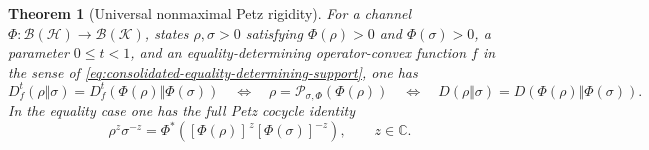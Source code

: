 \documentclass[11pt]{article}
\newtheorem{theorem}[theorem]{Theorem}
\theoremstyle{remark}
\newcommand{\1}{\mathbbm{1}}
\begin{document}
\begin{theorem}[Universal nonmaximal Petz rigidity]
\label{thm:consolidated-interior-rigidity}
For a channel
$\Phi:\mathcal B(\mathcal H)\to\mathcal B(\mathcal K)$,
states $\rho,\sigma>0$ satisfying
$\Phi(\rho)>0$ and $\Phi(\sigma)>0$, a parameter $0\leq t<1$,
and an equality-determining operator-convex function $f$ in the sense of
\eqref{eq:consolidated-equality-determining-support}, one has
\begin{equation}
 D_f^t(\rho\Vert\sigma)=D_f^t(\Phi(\rho)\Vert\Phi(\sigma))
 \quad\Longleftrightarrow\quad
 \rho=\mathcal P_{\sigma,\Phi}(\Phi(\rho))
 \quad\Longleftrightarrow\quad
 D(\rho\Vert\sigma)=D(\Phi(\rho)\Vert\Phi(\sigma)).
 \label{eq:consolidated-interior-rigidity}
\end{equation}
In the equality case one has the full Petz cocycle identity
\begin{equation}
 \rho^z\sigma^{-z}
 =\Phi^*\!\left([\Phi(\rho)]^{\,z}[\Phi(\sigma)]^{-z}\right),
 \qquad z\in\mathbb C.
\end{equation}
\end{theorem}
\end{document}
